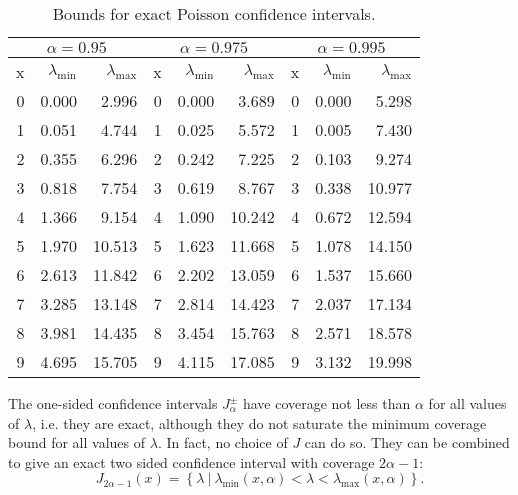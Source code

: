 \documentclass[11pt]{article}
\begin{document}
\begin{table}
\begin{center}
\begin{tabular}{|rrr|rrr|rrr|}
\hline
    \multicolumn{3}{|c|}{$\alpha = 0.95$} &
    \multicolumn{3}{|c|}{$\alpha = 0.975$} &
    \multicolumn{3}{|c|}{$\alpha = 0.995$}\\
\hline
    x &     $\lambda_{\mathrm{min}}$ &   $\lambda_{\mathrm{max}}$ &
    x &     $\lambda_{\mathrm{min}}$ &   $\lambda_{\mathrm{max}}$ &
    x &     $\lambda_{\mathrm{min}}$ &   $\lambda_{\mathrm{max}}$ \\
\hline
\hline
 0 & 0.000 &  2.996 & 0 & 0.000 &  3.689 & 0 & 0.000 &  5.298 \\
 1 & 0.051 &  4.744 & 1 & 0.025 &  5.572 & 1 & 0.005 &  7.430 \\
 2 & 0.355 &  6.296 & 2 & 0.242 &  7.225 & 2 & 0.103 &  9.274 \\
 3 & 0.818 &  7.754 & 3 & 0.619 &  8.767 & 3 & 0.338 & 10.977 \\
 4 & 1.366 &  9.154 & 4 & 1.090 & 10.242 & 4 & 0.672 & 12.594 \\
 5 & 1.970 & 10.513 & 5 & 1.623 & 11.668 & 5 & 1.078 & 14.150 \\
 6 & 2.613 & 11.842 & 6 & 2.202 & 13.059 & 6 & 1.537 & 15.660 \\
 7 & 3.285 & 13.148 & 7 & 2.814 & 14.423 & 7 & 2.037 & 17.134 \\
 8 & 3.981 & 14.435 & 8 & 3.454 & 15.763 & 8 & 2.571 & 18.578 \\
 9 & 4.695 & 15.705 & 9 & 4.115 & 17.085 & 9 & 3.132 & 19.998 \\
\hline
\end{tabular}
\end{center} 
\caption {\label{tab:poisson_bounds} Bounds for exact Poisson confidence
intervals.}
\end{table}

The one-sided confidence intervals $J^{\pm}_\alpha$ have coverage not less than
$\alpha$ for all values of $\lambda$, i.e. they are exact, although they do not
saturate the minimum coverage bound for all values of $\lambda$. In fact, no
choice of $J$ can do so. They can be combined to give an exact two sided
confidence interval with coverage $2\alpha - 1$:
\begin{equation}
    J_{2 \alpha - 1}(x) = \left\{
    \lambda\ |\ \lambda_{\mathrm{min}}(x, \alpha) < \lambda 
    <  \lambda_{\mathrm{max}}(x, \alpha) \right\}.
\end{equation}
\end{document}
